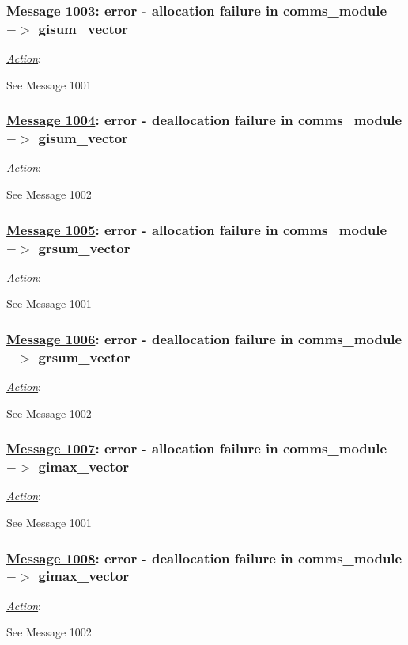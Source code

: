 \subsubsection*{\underline{Message 1003}: error - allocation failure in comms\_module $->$ gisum\_vector}

\noindent \underline{\em Action}:

See Message 1001

\subsubsection*{\underline{Message 1004}: error - deallocation failure in comms\_module $->$ gisum\_vector}

\noindent \underline{\em Action}:

See Message 1002

\subsubsection*{\underline{Message 1005}: error - allocation failure in comms\_module $->$ grsum\_vector}

\noindent \underline{\em Action}:

See Message 1001

\subsubsection*{\underline{Message 1006}: error - deallocation failure in comms\_module $->$ grsum\_vector}

\noindent \underline{\em Action}:

See Message 1002

\subsubsection*{\underline{Message 1007}: error - allocation failure in comms\_module $->$ gimax\_vector}

\noindent \underline{\em Action}:

See Message 1001

\subsubsection*{\underline{Message 1008}: error - deallocation failure in comms\_module $->$ gimax\_vector}

\noindent \underline{\em Action}:

See Message 1002


